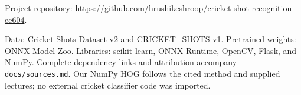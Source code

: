 Project repository: \url{https://github.com/hrushikeshroop/cricket-shot-recognition-ee604}.

Data: \href{https://www.kaggle.com/datasets/aneesh10/cricket-shot-dataset}{Cricket Shots Dataset v2} and \href{https://www.kaggle.com/datasets/amittalmale/cricket-shots}{CRICKET\_SHOTS v1}. Pretrained weights: \href{https://github.com/onnx/models}{ONNX Model Zoo}. Libraries: \href{https://github.com/scikit-learn/scikit-learn}{scikit-learn}, \href{https://github.com/microsoft/onnxruntime}{ONNX Runtime}, \href{https://github.com/opencv/opencv}{OpenCV}, \href{https://github.com/pallets/flask}{Flask}, and \href{https://github.com/numpy/numpy}{NumPy}. Complete dependency links and attribution accompany \texttt{docs/sources.md}. Our NumPy HOG follows the cited method and supplied lectures; no external cricket classifier code was imported.
